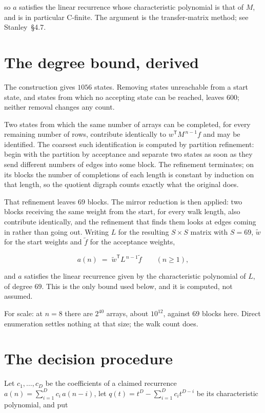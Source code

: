 \documentclass[11pt]{article}
\theoremstyle{definition}
\begin{document}
so $a$ satisfies the linear recurrence whose characteristic polynomial is that of $M$, and is in particular C-finite. The argument is the transfer-matrix method; see Stanley~\S4.7.

\section{The degree bound, derived}

The construction gives $1056$ states. Removing states unreachable from a start state, and states from which no accepting state can be reached, leaves $600$; neither removal changes any count.

Two states from which the same number of arrays can be completed, for every remaining number of rows, contribute identically to $w^{\mathsf T}M^{\,n-1}f$ and may be identified. The coarsest such identification is computed by partition refinement: begin with the partition by acceptance and separate two states as soon as they send different numbers of edges into some block. The refinement terminates; on its blocks the number of completions of each length is constant by induction on that length, so the quotient digraph counts exactly what the original does.

That refinement leaves $69$ blocks. The mirror reduction is then applied: two blocks receiving the same weight from the start, for every walk length, also contribute identically, and the refinement that finds them looks at edges coming in rather than going out. Writing $L$ for the resulting $S \times S$ matrix with $S = 69$, $\tilde w$ for the start weights and $\tilde f$ for the acceptance weights,

\[a(n) \;=\; \tilde w^{\mathsf T} L^{\,n-1} \tilde f \qquad (n \ge 1),\]

and $a$ satisfies the linear recurrence given by the characteristic polynomial of $L$, of degree $69$. This is the only bound used below, and it is computed, not assumed.

For scale: at $n = 8$ there are $2^{40}$ arrays, about $10^{12}$, against $69$ blocks here. Direct enumeration settles nothing at that size; the walk count does.

\section{The decision procedure}

Let $c_1,\dots,c_D$ be the coefficients of a claimed recurrence $a(n) = \sum_{i=1}^{D} c_i\,a(n-i)$, let $q(t) = t^{D} - \sum_{i=1}^{D} c_i t^{D-i}$ be its characteristic polynomial, and put
\end{document}
